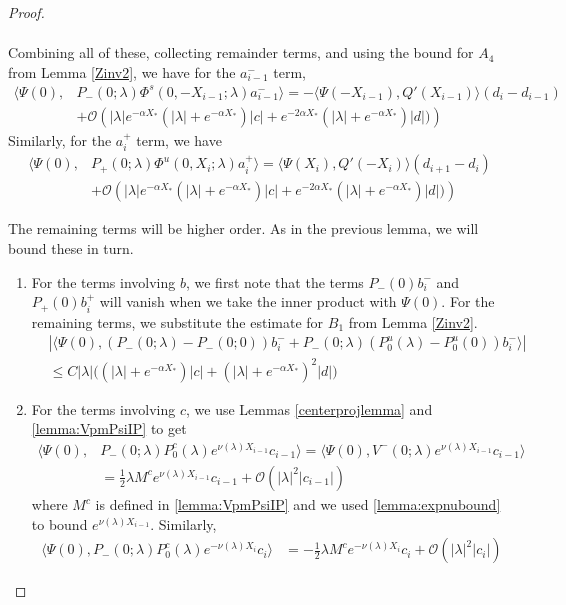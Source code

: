 \documentclass[thesis.tex]{subfiles}
\begin{document}
\begin{lemma}
\begin{proof}
\begin{enumerate}
\begin{align*}
\end{align*}
Combining all of these, collecting remainder terms, and using the bound for $A_4$ from Lemma \ref{Zinv2}, we have for the $a_{i-1}^-$ term,
\begin{align*}
\langle \Psi(0), &P_-(0; \lambda) \Phi^s(0, -X_{i-1}; \lambda) a_{i-1}^- \rangle = -\langle \Psi(-X_{i-1}), Q'(X_{i-1}) \rangle (d_i - d_{i-1} ) \\
&+ \mathcal{O} \left( |\lambda|e^{-\alpha X_*}(|\lambda| + e^{-\alpha X_*})|c| + e^{-2 \alpha X_*} (|\lambda| + e^{-\alpha X_*}) |d| ) \right)
\end{align*}
Similarly, for the $a_i^+$ term, we have
\begin{align*}
\langle \Psi(0), &P_+(0; \lambda) \Phi^u(0, X_i; \lambda) a_i^+ \rangle = \langle \Psi(X_i), Q'(-X_i) \rangle (d_{i+1} - d_i ) \\
&+ \mathcal{O} \left( |\lambda|e^{-\alpha X_*}(|\lambda| + e^{-\alpha X_*})|c| + e^{-2 \alpha X_*} (|\lambda| + e^{-\alpha X_*}) |d| ) \right)
\end{align*}
\end{enumerate}

The remaining terms will be higher order. As in the previous lemma, we will bound these in turn.

\begin{enumerate}

\item For the terms involving $b$, we first note that the terms $P_-(0) b_i^-$ and $P_+(0)b_i^+$ will vanish when we take the inner product with $\Psi(0)$. For the remaining terms, we substitute the estimate for $B_1$ from Lemma \ref{Zinv2}.
\begin{align*}
&|\langle \Psi(0), (P_-(0; \lambda) - P_-(0; 0))b_i^- + P_-(0; \lambda)(P_0^u(\lambda) - P_0^u(0))b_i^- \rangle | \\
&\leq C |\lambda| \Big( (|\lambda| + e^{-\alpha X_*})|c| + (|\lambda| + e^{-\alpha X_*})^2 |d| \Big)
\end{align*}

\item For the terms involving $c$, we use Lemmas \ref{centerprojlemma} and \ref{lemma:VpmPsiIP} to get
\begin{align*}
\langle \Psi(0), &P_-(0; \lambda) P_0^c(\lambda) e^{\nu(\lambda) X_{i-1}} c_{i-1} \rangle = \langle \Psi(0), V^-(0; \lambda) e^{\nu(\lambda) X_{i-1}} c_{i-1} \rangle  \\
&= \frac{1}{2} \lambda M^c e^{\nu(\lambda) X_{i-1}} c_{i-1} + \mathcal{O}(|\lambda|^2 |c_{i-1}|)
\end{align*}
where $M^c$ is defined in \cref{lemma:VpmPsiIP} and we used \cref{lemma:expnubound} to bound $e^{\nu(\lambda) X_{i-1}}$. Similarly, 
\begin{align*}
\langle \Psi(0), P_-(0; \lambda) P_0^c(\lambda) e^{-\nu(\lambda) X_i} c_i \rangle 
&= -\frac{1}{2} \lambda M^c e^{-\nu(\lambda) X_i} c_i + \mathcal{O}(|\lambda|^2|c_i|)
\end{align*}


\end{enumerate}
\end{proof}
\end{lemma}
\end{document}
